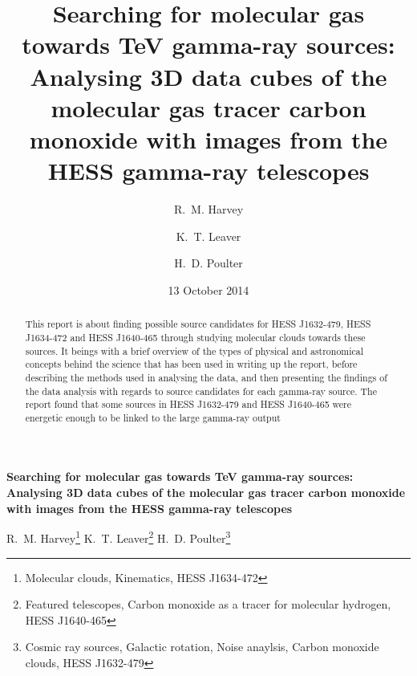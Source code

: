\documentclass[a4paper, titlepage, oneside]{article}
\begin{document}
\title{\textbf{Searching for molecular gas towards TeV gamma-ray sources: Analysing 3D data cubes of the molecular gas tracer carbon monoxide with images from the HESS gamma-ray telescopes}}
\author{R.~M. Harvey \and K.~T. Leaver \and H.~D. Poulter}
\date{13 October 2014} %


\setcounter{page}{1}

\tableofcontents

\clearpage
\setcounter{page}{1}

\begin{center}
  {\large \textbf{Searching for molecular gas towards TeV gamma-ray sources: Analysing 3D data cubes of the molecular gas tracer carbon monoxide with images from the HESS gamma-ray telescopes}}

  \vspace{1.5em}

  R.~M. Harvey\footnote{Molecular clouds, Kinematics, HESS J1634-472} \quad K.~T. Leaver\footnote{Featured telescopes, Carbon monoxide as a tracer for molecular hydrogen, HESS J1640-465} \quad H.~D. Poulter\footnote{Cosmic ray sources, Galactic rotation, Noise anaylsis, Carbon monoxide clouds, HESS J1632-479}
\end{center}

\vspace{1.5em}

\begin{minipage}{0.93\textwidth}
  \begin{abstract} %
  This report is about finding possible source candidates for HESS J1632-479, HESS J1634-472 and HESS J1640-465 through studying molecular clouds towards these sources. It beings with a brief overview of the types of physical and astronomical concepts behind the science that has been used in writing up the report, before describing the methods used in analysing the data, and then presenting the findings of the data analysis with regards to source candidates for each gamma-ray source. The report found that some sources in HESS J1632-479 and HESS J1640-465 were energetic enough to be linked to the large gamma-ray output
  \end{abstract}
\end{minipage}

\vspace{1em}
\end{document}
